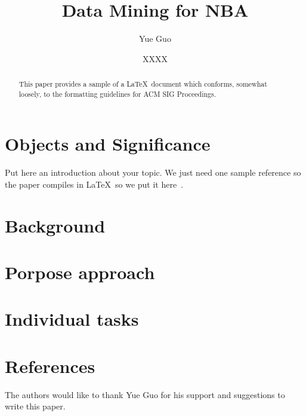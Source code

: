 \title{Data Mining for NBA}


\author{Yue Guo}


\author{XXXX}


\renewcommand{\shortauthors}{G. v. Laszewski}


\begin{abstract}
This paper provides a sample of a \LaTeX\ document which conforms,
somewhat loosely, to the formatting guidelines for
ACM SIG Proceedings.
\end{abstract}



\maketitle



\section{Objects and Significance}

Put here an introduction about your topic. 
We just need one sample reference so the paper compiles in \LaTeX\ so we
put it here~\cite{editor00}.

\section{Background}



\section{Porpose approach}


\section{Individual tasks}


\section{References}



\begin{acks}

  The authors would like to thank Yue Guo for his
  support and suggestions to write this paper.

\end{acks}


 

